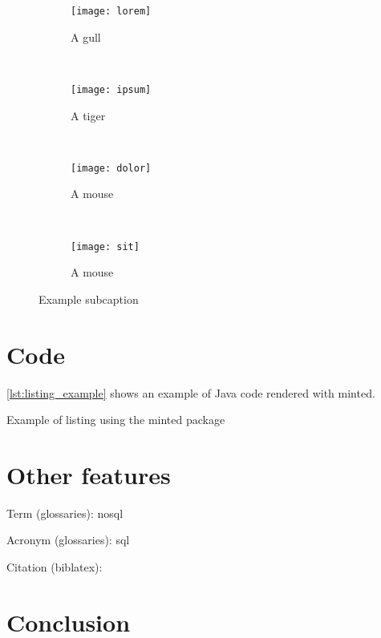 \begin{figure}[!ht]
	\centering
	\begin{subfigure}[b]{0.45\textwidth}
		\texttt{[image: lorem]}
		\caption{A gull}
		\label{fig:lorem}
	\end{subfigure}
	~ %
	\begin{subfigure}[b]{0.45\textwidth}
		\texttt{[image: ipsum]}
		\caption{A tiger}
		\label{fig:ipsum}
	\end{subfigure}
	~ %
	\begin{subfigure}[b]{0.45\textwidth}
		\texttt{[image: dolor]}
		\caption{A mouse}
		\label{fig:dolor}
	\end{subfigure}
	~ %
	\begin{subfigure}[b]{0.45\textwidth}
		\texttt{[image: sit]}
		\caption{A mouse}
		\label{fig:sit}
	\end{subfigure}
	\caption{Example subcaption}\label{fig:animals}
\end{figure}


\section{Code}

\autoref{lst:listing_example} shows an example of Java code rendered with minted.

\begin{listing}[!ht]
	\caption{Example of listing using the minted package}
	\label{lst:listing_example}
\end{listing}

\section{Other features}

Term (glossaries): \gls{nosql}

Acronym (glossaries): \gls{sql}

Citation (biblatex): \cite{paper_millwheel}

\section{Conclusion}

\blindtext
